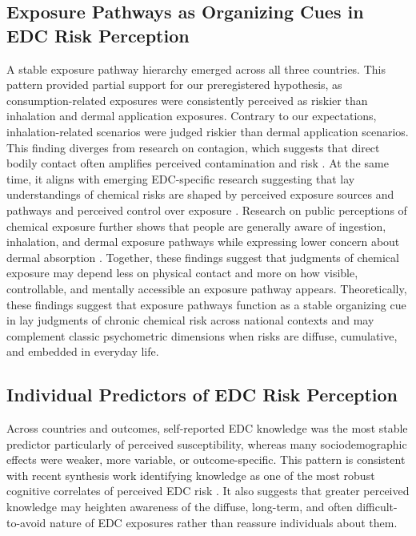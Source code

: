 \subsection{Exposure Pathways as Organizing Cues in EDC Risk Perception}
A stable exposure pathway hierarchy emerged across all three countries. This pattern provided partial support for our preregistered hypothesis, as consumption-related exposures were consistently perceived as riskier than inhalation and dermal application exposures. Contrary to our expectations, inhalation-related scenarios were judged riskier than dermal application scenarios. This finding diverges from research on contagion, which suggests that direct bodily contact often amplifies perceived contamination and risk \citep{rozin1986operation, rozin1992magical}. At the same time, it aligns with emerging EDC-specific research suggesting that lay understandings of chemical risks are shaped by perceived exposure sources and pathways and perceived control over exposure \citep{kelly2020public, boronow2025people}. Research on public perceptions of chemical exposure further shows that people are generally aware of ingestion, inhalation, and dermal exposure pathways while expressing lower concern about dermal absorption \citep{matisane2022citizens}. Together, these findings suggest that judgments of chemical exposure may depend less on physical contact and more on how visible, controllable, and mentally accessible an exposure pathway appears. Theoretically, these findings suggest that exposure pathways function as a stable organizing cue in lay judgments of chronic chemical risk across national contexts and may complement classic psychometric dimensions when risks are diffuse, cumulative, and embedded in everyday life.

\subsection{Individual Predictors of EDC Risk Perception}
Across countries and outcomes, self-reported EDC knowledge was the most stable predictor particularly of perceived susceptibility, whereas many sociodemographic effects were weaker, more variable, or outcome-specific. This pattern is consistent with recent synthesis work identifying knowledge as one of the most robust cognitive correlates of perceived EDC risk \citep{pravednikov2024main}. It also suggests that greater perceived knowledge may heighten awareness of the diffuse, long-term, and often difficult-to-avoid nature of EDC exposures rather than reassure individuals about them.

